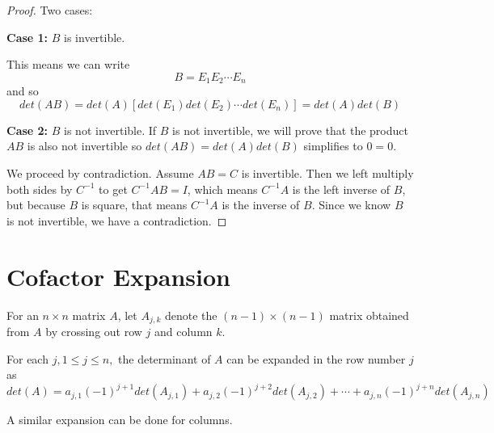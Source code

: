 \begin{proof}
Two cases: 

\textbf{Case 1: } $B$ is invertible. 

This means we can write 
$$B = E_{1} E_{2} \cdots E_{n}$$
and so 
$$det(AB) = det(A)[det(E_{1}) det(E_{2}) \cdots det(E_{n})] = det(A) det(B)$$

\textbf{Case 2: } $B$ is not invertible. 
If $B$ is not invertible, we will prove that the product $AB$ is also not invertible so $det(AB) = det(A) det(B)$ simplifies to $0 = 0$. 

We proceed by contradiction. Assume $AB = C$ is invertible. Then we left multiply both sides by $C^{-1}$ to get $C^{-1} AB = I$, which means $C^{-1}A$ is the left inverse of $B$, but because $B$ is square, that means $C^{-1}A$ is the inverse of $B$. Since we know $B$ is not invertible, we have a contradiction. 
\end{proof}

\section{Cofactor Expansion}

For an $n \times n$ matrix $A$, let $A_{j, k}$ denote the $(n - 1) \times (n - 1)$ matrix obtained from $A$ by crossing out row $j$ and column $k$. 

\begin{theorem}
For each $j, 1 \leq j \leq n,$ the determinant of $A$ can be expanded in the row number $j$ as 
$$det(A) = a_{j, 1} (-1)^{j+1} det(A_{j, 1}) + a_{j, 2} (-1)^{j+2} det(A_{j, 2}) + \cdots + a_{j, n} (-1)^{j + n} det(A_{j, n})$$

A similar expansion can be done for columns. 
\end{theorem}

